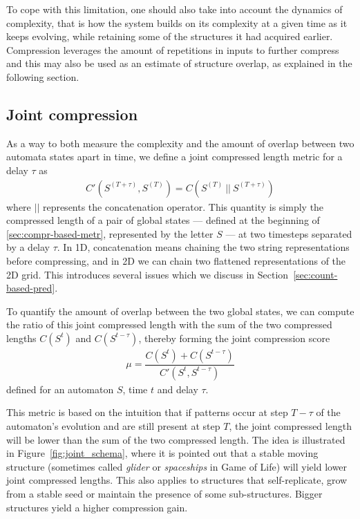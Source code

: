To cope with this limitation, one should also take into account the dynamics of
complexity, that is how the system builds on its complexity at a given time as
it keeps evolving, while retaining some of the structures it had acquired
earlier. Compression leverages the amount of repetitions in inputs to further
compress and this may also be used as an estimate of structure overlap, as
explained in the following section.

\subsection{Joint compression}\label{sec:joint-compression}

As a way to both measure the complexity and the amount of overlap between two
automata states apart in time, we define a joint compressed length metric for a
delay $\tau$ as
\begin{align}
  \textstyle C'\left(S^{(T + \tau)}, S^{(T)}\right) =
  C\left(S^{(T)}\ ||\ S^{(T + \tau)}\right)
\end{align}
where $||$ represents the concatenation operator. This quantity is simply the
compressed length of a pair of global states --- defined at the beginning of
\ref{sec:compr-based-metr}, represented by the letter $S$ --- at two timesteps
separated by a delay $\tau$. In 1D, concatenation means chaining the two string
representations before compressing, and in 2D we can chain two flattened
representations of the 2D grid. This introduces several issues which we discuss
in Section~\ref{sec:count-based-pred}.

To quantify the amount of overlap between the two global states, we can compute
the ratio of this joint compressed length with the sum of the two compressed
lengths $C(S^t)$ and $C(S^{t-\tau})$, thereby forming the joint compression
score
\begin{align}
  \textstyle \mu = \dfrac{C\left( S^t \right) +
  C\left( S^{t - \tau} \right)}{C'\left( S^t, S^{t - \tau} \right)}
\end{align}
defined for an automaton $S$, time $t$ and delay $\tau$.

This metric is based on the intuition that if patterns occur at step $T - \tau$
of the automaton's evolution and are still present at step $T$, the joint
compressed length will be lower than the sum of the two compressed length. The
idea is illustrated in Figure~\ref{fig:joint_schema}, where it is pointed out
that a stable moving structure (sometimes called \emph{glider} or
\emph{spaceships} in Game of Life) will yield lower joint compressed lengths.
This also applies to structures that self-replicate, grow from a stable seed or
maintain the presence of some sub-structures. Bigger structures yield a higher
compression gain.

